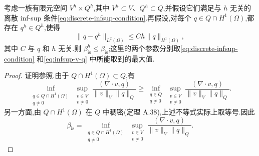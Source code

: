 \begin{lemma}\label{lem:discrete-infsup-bounded-by-continuous}
考虑一族有限元空间 $V^h\times Q^h$,其中 $V^h\subset V$、$Q^h\subset Q$,并假设它们满足与 $h$ 无关的离散 inf-sup 条件\cref{eq:discrete-infsup-condition}.再假设,对每个 $q\in Q\cap H^1(\Omega)$,都存在 $q^h\in Q^h$,使得
\begin{equation}\label{eq:pressure-approximation-assumption}
  \|q-q^h\|_{L^2(\Omega)}
    \le Ch\|q\|_{H^1(\Omega)},
\end{equation}
其中 $C$ 与 $q$ 和 $h$ 无关.则 $\beta_{\mathrm{is}}^h\le\beta_{\mathrm{is}}$;这里的两个参数分别取\cref{eq:discrete-infsup-condition} 和\cref{eq:infsup-v-q} 中所能取到的最大值.
\end{lemma}
\begin{proof}
证明参照\textcite{ChizhonkovOlshanskii2000}.由于 $Q\cap H^1(\Omega)\subset Q$,有
\[
  \inf_{\substack{q\in Q\cap H^1(\Omega)\\q\ne0}}
  \sup_{\substack{v\in V\\v\ne0}}
    \frac{(\nabla\cdot v,q)}{\|v\|_V\|q\|_Q}
  \ge
  \inf_{\substack{q\in Q\\q\ne0}}
  \sup_{\substack{v\in V\\v\ne0}}
    \frac{(\nabla\cdot v,q)}{\|v\|_V\|q\|_Q}.
\]
另一方面,由 $Q\cap H^1(\Omega)$ 在 $Q$ 中稠密(定理 A.38),上述不等式实际上取等号.因此
\begin{equation}\label{eq:infsup-dense-pressure-subspace}
  \beta_{\mathrm{is}}
   =\inf_{\substack{q\in Q\cap H^1(\Omega)\\q\ne0}}
      \sup_{\substack{v\in V\\v\ne0}}
        \frac{(\nabla\cdot v,q)}{\|v\|_V\|q\|_Q}.
\end{equation}


\end{proof}

